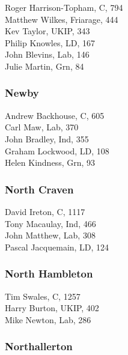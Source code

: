 \documentclass[a4paper,openany,10pt]{book}
\begin{document}
{Roger Harrison-Topham}, C, 794\\
Matthew Wilkes, Friarage, 444\\
Kev Taylor, UKIP, 343\\
Philip Knowles, LD, 167\\
John Blevins, Lab, 146\\
Julie Martin, Grn, 84\\


\subsubsection*{Newby}



Andrew Backhouse, C, 605\\
Carl Maw, Lab, 370\\
John Bradley, Ind, 355\\
Graham Lockwood, LD, 108\\
Helen Kindness, Grn, 93\\


\subsubsection*{North Craven}



David Ireton, C, 1117\\
Tony Macaulay, Ind, 466\\
John Matthew, Lab, 308\\
Pascal Jacquemain, LD, 124\\


\subsubsection*{North Hambleton}



Tim Swales, C, 1257\\
Harry Burton, UKIP, 402\\
Mike Newton, Lab, 286\\


\subsubsection*{Northallerton}
\end{document}
